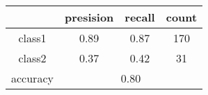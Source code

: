 
    \begin{tabular}{ | c | c | c | c | }
	\hline
	 & presision & recall & count \\ \hline
	class1 & 0.89 & 0.87 & 170 \\ \hline
	class2 & 0.37 & 0.42 & 31  \\ \hline
	\hline
	accuracy & \multicolumn{3}{c|}{0.80} \\
	\hline
    \end{tabular}